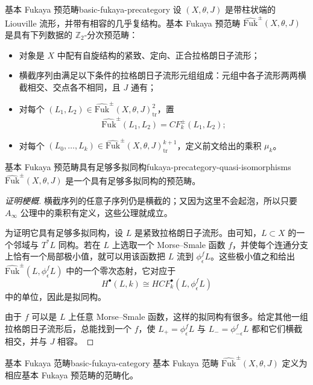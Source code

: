 \begin{definition}{基本 Fukaya 预范畴}{basic-fukaya-precategory}
设 $(X,\theta,J)$ 是带柱状端的 Liouville 流形，并带有相容的几乎复结构。基本 Fukaya 预范畴 $\widehat{\mathrm{Fuk}}^{\pm}(X,\theta,J)$ 是具有下列数据的 $\mathbb Z_2$-分次预范畴：
\begin{itemize}
  \item 对象是 $X$ 中配有自旋结构的紧致、定向、正合拉格朗日子流形；
  \item 横截序列由满足以下条件的拉格朗日子流形元组组成：元组中各子流形两两横截相交、交点各不相同，且 $J$ 通有；
  \item 对每个 $(L_1,L_2)\in\widehat{\mathrm{Fuk}}^{\pm}(X,\theta,J)^2_{\mathrm{tr}}$，置
  \[
    \widehat{\mathrm{Fuk}}^{\pm}(L_1,L_2)=CF_k^{\pm}(L_1,L_2);
  \]
  \item 对每个 $(L_0,\ldots,L_k)\in\widehat{\mathrm{Fuk}}^{\pm}(X,\theta,J)^{k+1}_{\mathrm{tr}}$，定义前文给出的乘积 $\mu_k$。
\end{itemize}
\end{definition}

\begin{lemma}{基本 Fukaya 预范畴具有足够多拟同构}{fukaya-precategory-quasi-isomorphisms}
$\widehat{\mathrm{Fuk}}^{\pm}(X,\theta,J)$ 是一个具有足够多拟同构的预范畴。
\end{lemma}
\begin{proof}[证明梗概]
横截序列的任意子序列仍是横截的；又因为这里不会起泡，所以只要 $A_\infty$ 公理中的乘积有定义，这些公理就成立。

为证明它具有足够多拟同构，设 $L$ 是紧致拉格朗日子流形。由可知，$L\subset X$ 的一个邻域与 $T^*L$ 同构。若在 $L$ 上选取一个 Morse--Smale 函数 $f$，并使每个连通分支上恰有一个局部极小值，就可以用该函数把 $L$ 流到 $\phi_\epsilon^fL$。这些极小值之和给出 $\widehat{\mathrm{Fuk}}^{\pm}(L,\phi_\epsilon^fL)$ 中的一个零次态射，它对应于
\[
  H^\bullet(L,k)\cong HCF_k^\bullet(L,\phi_\epsilon^fL)
\]
中的单位，因此是拟同构。

由于 $f$ 可以是 $L$ 上任意 Morse--Smale 函数，这样的拟同构有很多。给定其他一组拉格朗日子流形后，总能找到一个 $f$，使 $L_+=\phi_\epsilon^fL$ 与 $L_-=\phi_{-\epsilon}^fL$ 都和它们横截相交，并与 $J$ 相容。
\end{proof}

\begin{definition}{基本 Fukaya 范畴}{basic-fukaya-category}
基本 Fukaya 范畴 $\widehat{\mathrm{Fuk}}^{\pm}(X,\theta,J)$ 定义为相应基本 Fukaya 预范畴的范畴化。
\end{definition}

